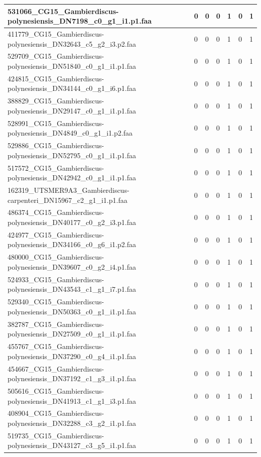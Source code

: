 \documentclass[12pt]{article}
\begin{document}
\begin{longtable}{ | p{2cm} | p{2cm} |p{2.5cm} | p{2cm} | p{2.5cm} |  p{2cm} | p{2cm} |}
 \hline 
531066\_CG15\_Gambierdiscus-polynesiensis\_DN7198\_c0\_g1\_i1.p1.faa&0&0&0&1&0&1\\ 
 \hline 
411779\_CG15\_Gambierdiscus-polynesiensis\_DN32643\_c5\_g2\_i3.p2.faa&0&0&0&1&0&1\\ 
 \hline 
529709\_CG15\_Gambierdiscus-polynesiensis\_DN51840\_c0\_g1\_i1.p1.faa&0&0&0&1&0&1\\ 
 \hline 
424815\_CG15\_Gambierdiscus-polynesiensis\_DN34144\_c0\_g1\_i6.p1.faa&0&0&0&1&0&1\\ 
 \hline 
388829\_CG15\_Gambierdiscus-polynesiensis\_DN29147\_c0\_g1\_i1.p1.faa&0&0&0&1&0&1\\ 
 \hline 
528991\_CG15\_Gambierdiscus-polynesiensis\_DN4849\_c0\_g1\_i1.p2.faa&0&0&0&1&0&1\\ 
 \hline 
529886\_CG15\_Gambierdiscus-polynesiensis\_DN52795\_c0\_g1\_i1.p1.faa&0&0&0&1&0&1\\ 
 \hline 
517572\_CG15\_Gambierdiscus-polynesiensis\_DN42942\_c0\_g1\_i1.p1.faa&0&0&0&1&0&1\\ 
 \hline 
162319\_UTSMER9A3\_Gambierdiscus-carpenteri\_DN15967\_c2\_g1\_i1.p1.faa&0&0&0&1&0&1\\ 
 \hline 
486374\_CG15\_Gambierdiscus-polynesiensis\_DN40177\_c0\_g2\_i3.p1.faa&0&0&0&1&0&1\\ 
 \hline 
424977\_CG15\_Gambierdiscus-polynesiensis\_DN34166\_c0\_g6\_i1.p2.faa&0&0&0&1&0&1\\ 
 \hline 
480000\_CG15\_Gambierdiscus-polynesiensis\_DN39607\_c0\_g2\_i4.p1.faa&0&0&0&1&0&1\\ 
 \hline 
524933\_CG15\_Gambierdiscus-polynesiensis\_DN43543\_c1\_g1\_i7.p1.faa&0&0&0&1&0&1\\ 
 \hline 
529340\_CG15\_Gambierdiscus-polynesiensis\_DN50363\_c0\_g1\_i1.p1.faa&0&0&0&1&0&1\\ 
 \hline 
382787\_CG15\_Gambierdiscus-polynesiensis\_DN27509\_c0\_g1\_i1.p1.faa&0&0&0&1&0&1\\ 
 \hline 
455767\_CG15\_Gambierdiscus-polynesiensis\_DN37290\_c0\_g4\_i1.p1.faa&0&0&0&1&0&1\\ 
 \hline 
454667\_CG15\_Gambierdiscus-polynesiensis\_DN37192\_c1\_g3\_i1.p1.faa&0&0&0&1&0&1\\ 
 \hline 
505616\_CG15\_Gambierdiscus-polynesiensis\_DN41913\_c1\_g1\_i3.p1.faa&0&0&0&1&0&1\\ 
 \hline 
408904\_CG15\_Gambierdiscus-polynesiensis\_DN32288\_c3\_g2\_i1.p1.faa&0&0&0&1&0&1\\ 
 \hline 
519735\_CG15\_Gambierdiscus-polynesiensis\_DN43127\_c3\_g5\_i1.p1.faa&0&0&0&1&0&1\\ 

\end{longtable}
\end{document}
